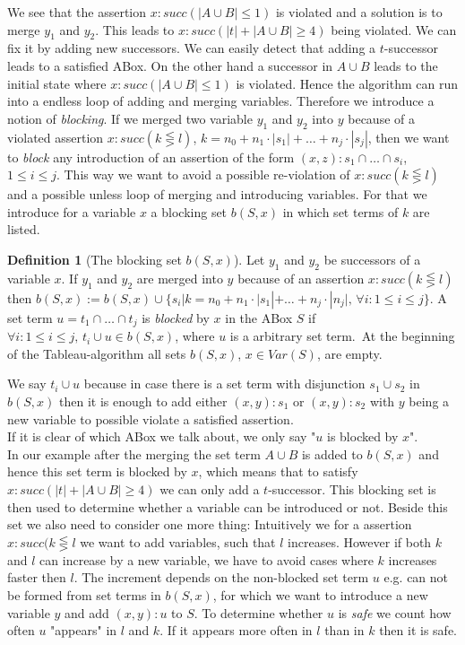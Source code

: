 \documentclass[a4paper,11pt]{scrartcl}
\theoremstyle{break}
\theoremstyle{definition}
\newtheorem{mydef}{Definition}
\begin{document}
We see that the assertion $x:succ(|A\cup B|\leq 1)$ is violated and a solution is to merge $y_1$ and $y_2$. This leads to $x:succ(|t|+|A\cup B|\geq 4)$ being violated. We can fix it by adding new successors. We can easily detect that adding a $t$-successor leads to a satisfied ABox. On the other hand a successor in $A\cup B$ leads to the initial state where $x:succ(|A\cup B|\leq 1)$ is violated. Hence the algorithm can run into a endless loop of adding and merging variables. Therefore we introduce a notion of \textit{blocking}. If we merged two variable $y_1$ and $y_2$ into $y$ because of a violated assertion $x:succ(k\lesseqgtr l)$, $k=n_0+n_1\cdot |s_1|+\dots + n_j\cdot|s_j|$, then we want to \textit{block} any introduction of an assertion of the form $(x,z):s_1\cap\dots \cap s_i$, $1\leq i\leq j$. This way we want to avoid a possible re-violation of $x:succ(k\lesseqgtr l)$ and a possible unless loop of merging and introducing variables. For that we introduce for a variable $x$ a blocking set $b(S,x)$ in which set terms of $k$ are listed.
\begin{mydef}[The blocking set $b(S,x)$]
Let $y_1$ and $y_2$ be successors of a variable $x$. If $y_1$ and $y_2$ are merged into $y$ because of an assertion $x:succ(k\lesseqgtr l)$ then $b(S,x):=b(S,x)\cup\{s_i|k=n_0+n_1\cdot|s_1|+\dots+n_j\cdot|n_j|,\,\forall i:1\leq i\leq j\}$. A set term $u=t_1\cap\dots\cap t_j$ is \textit{blocked} by $x$ in the ABox $S$ if $\forall i:1\leq i\leq j,\, t_i\cup u\in b(S,x)$, where $u$ is a arbitrary set term.\
At the beginning of the Tableau-algorithm all sets $b(S,x)$, $x\in Var(S)$, are empty.
\end{mydef}
We say $t_i\cup u$ because in case there is a set term with disjunction $s_1\cup s_2$ in $b(S,x)$ then it is enough to add either $(x,y):s_1$ or $(x,y):s_2$ with $y$ being a new variable to possible violate a satisfied assertion.\\
If it is clear of which ABox we talk about, we only say "$u$ is blocked by $x$".\\
In our example after the merging the set term $A\cup B$ is added to $b(S,x)$ and hence this set term is blocked by $x$, which means that to satisfy $x:succ(|t|+|A\cup B|\geq 4)$ we can only add a $t$-successor. This blocking set is then used to determine whether a variable can be introduced or not. Beside this set we also need to consider one more thing: Intuitively we for a assertion $x:succ(k\lesseqgtr l$ we want to add variables, such that $l$ increases. However if both $k$ and $l$ can increase by a new variable, we have to avoid cases where $k$ increases faster then $l$. The increment depends on the non-blocked set term $u$ e.g. can not be formed from set terms in $b(S,x)$, for which we want to introduce a new variable $y$ and add $(x,y):u$ to $S$. To determine whether $u$ is \textit{safe} we count how often $u$ "appears" in $l$ and $k$. If it appears more often in $l$ than in $k$ then it is safe.
\end{document}
